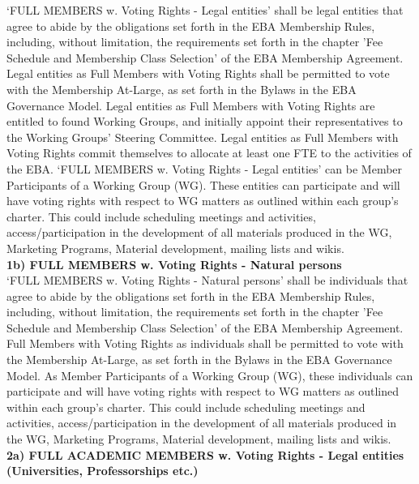 \documentclass{article}
\begin{document}
‘FULL MEMBERS w. Voting Rights - Legal entities’ shall be legal entities that agree to abide by the obligations set forth in the EBA Membership Rules, including, without limitation, the requirements set forth in the chapter 'Fee Schedule and Membership Class Selection' of the EBA Membership Agreement. 
Legal entities as Full Members with Voting Rights shall be permitted to vote with the Membership At-Large, as set forth in the Bylaws in the EBA Governance Model. 
Legal entities as Full Members with Voting Rights are entitled to found Working Groups, and initially appoint their representatives to the Working Groups’ Steering Committee. 
Legal entities as Full Members with Voting Rights commit themselves to allocate at least one FTE to the activities of the EBA. 
‘FULL MEMBERS w. Voting Rights - Legal entities’ can be Member Participants of a Working Group (WG). These entities can participate and will have voting rights with respect to WG matters as outlined within each group's charter. 
This could include scheduling meetings and activities, access/participation in the development of all materials produced in the WG, Marketing Programs, Material development, mailing lists and wikis. \\

\textbf{1b) FULL MEMBERS w. Voting Rights - Natural persons} \\

‘FULL MEMBERS w. Voting Rights - Natural persons’ shall be individuals that agree to abide by the obligations set forth in the EBA Membership Rules, including, without limitation, the requirements set forth in the chapter 'Fee Schedule and Membership Class Selection' of the EBA Membership Agreement. 
Full Members with Voting Rights as individuals shall be permitted to vote with the Membership At-Large, as set forth in the Bylaws in the EBA Governance Model. 
As Member Participants of a Working Group (WG), these individuals can participate and will have voting rights with respect to WG matters as outlined within each group's charter. 
This could include scheduling meetings and activities, access/participation in the development of all materials produced in the WG, Marketing Programs, Material development, mailing lists and wikis. \\

\textbf{2a) FULL ACADEMIC MEMBERS w. Voting Rights - Legal entities (Universities, Professorships etc.)}
\end{document}
